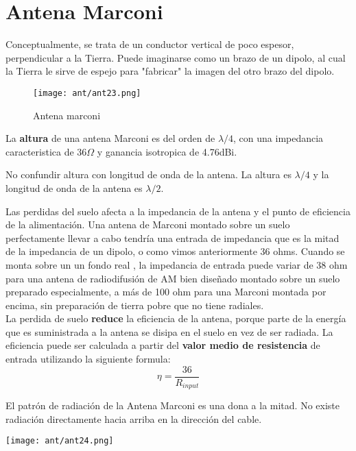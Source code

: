 \documentclass[
	12pt, %
	fleqn, %
	a4paper, %
	oneside, %
]{LegrandOrangeBook}
\begin{document}
\section{Antena Marconi}
Conceptualmente, se trata de un conductor vertical de poco espesor, perpendicular a la Tierra. Puede imaginarse como un brazo de un dipolo, al cual la Tierra le sirve de espejo para "fabricar" la imagen del otro brazo del dipolo.
\begin{wrapfigure}{r}{0.45\linewidth}
  \begin{center}
    \texttt{[image: ant/ant23.png]}
  \end{center}
  \caption{Antena marconi}
\end{wrapfigure}
La \textbf{altura} de una antena Marconi es del orden de $\lambda/4$, con una impedancia caracteristica de $36\Omega$ y ganancia isotropica de 4.76dBi.
\begin{remark}
No confundir altura con longitud de onda de la antena. La altura es $\lambda/4$ y la longitud de onda de la antena es $\lambda/2$.
\end{remark}
Las perdidas del suelo afecta a la impedancia de la antena y el punto de eficiencia de la alimentación. Una antena de Marconi montado sobre un suelo perfectamente llevar a cabo tendría una entrada de impedancia que es la mitad de la impedancia de un dipolo, o como vimos anteriormente 36 ohms. Cuando se monta sobre un un fondo real , la impedancia de entrada puede variar de 38 ohm para una antena de radiodifusión de AM bien diseñado montado sobre un suelo preparado especialmente, a más de 100 ohm para una Marconi montada por encima, sin preparación de tierra pobre que no tiene radiales.\\
La perdida de suelo \textbf{reduce} la eficiencia de la antena, porque parte de la energía que es suministrada a la antena se disipa en el suelo en vez de ser radiada. La eficiencia puede ser calculada a partir del \textbf{valor medio de resistencia} de entrada utilizando la siguiente formula:
\begin{equation}
\eta=\frac{36}{R_{input}}
\end{equation}
\begin{remark}
El patrón de radiación de la Antena Marconi es una dona a la mitad. No existe radiación directamente hacia arriba en la dirección del cable.
\begin{center}
\texttt{[image: ant/ant24.png]}
\end{center}
\end{remark}
\end{document}
